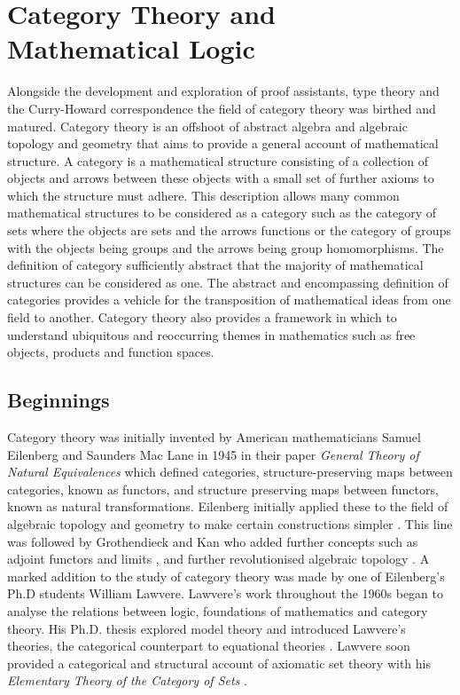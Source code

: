 \section{Category Theory and Mathematical Logic}
Alongside the development and exploration of  proof assistants, type theory and
the Curry-Howard correspondence the field of category theory was birthed and
matured. Category theory is an offshoot of abstract algebra and algebraic
topology and geometry that aims to provide a general account of mathematical
structure. A category is a mathematical structure consisting of a collection of
objects and arrows between these objects with a small set of further axioms to
which the structure must adhere. This description allows many common
mathematical structures to be considered as a category such as the category of
sets where the objects are sets and the arrows functions or the category of
groups with the objects being groups and the arrows being group homomorphisms.
The definition of category sufficiently abstract that the majority of
mathematical structures can be considered as one. The abstract and encompassing
definition of categories provides a vehicle for the transposition of
mathematical ideas from one field to another. Category theory also provides a
framework in which to understand ubiquitous and reoccurring themes in mathematics
such as free objects, products and function spaces.
\subsection{Beginnings}
Category theory was initially invented by American mathematicians Samuel
Eilenberg and Saunders Mac Lane in 1945 in their paper \textit{General Theory of
Natural Equivalences} \cite{eilenberg1945general} which defined categories, structure-preserving maps
between categories, known as functors, and structure preserving maps between
functors, known as natural transformations. Eilenberg initially applied these to
the field of algebraic topology and geometry to make certain constructions
simpler \cite{eilenberg1945axiomatic}.  This line was followed by Grothendieck
and Kan who added further concepts such as adjoint functors  and limits
\cite{kan1958adjoint}, and further revolutionised algebraic topology
\cite{grothendieck1957quelques}. A marked addition to the study of category
theory was made by one of Eilenberg's Ph.D students William Lawvere. Lawvere's
work throughout the 1960s began to analyse the relations between logic,
foundations of mathematics and category theory. His Ph.D. thesis explored model
theory and introduced Lawvere's theories, the categorical counterpart to
equational theories \cite{lawvere1963functorial}. Lawvere soon provided a
categorical and structural account of axiomatic set theory with his
\textit{Elementary Theory of the Category of Sets} \cite{lawvere1964elementary}.

